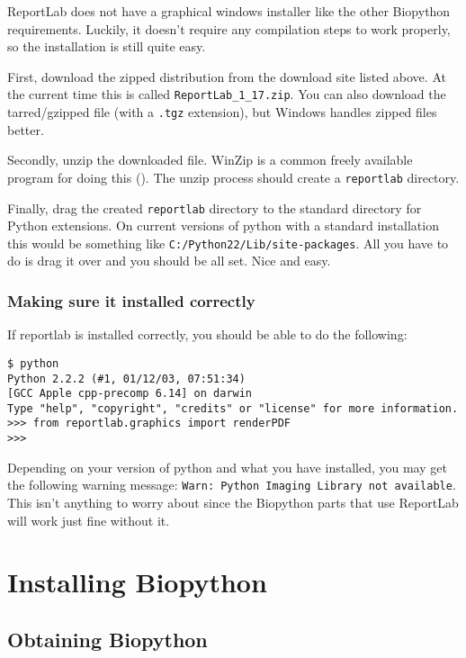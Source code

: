 \documentclass{article}
\begin{document}
ReportLab does not have a graphical windows installer like the other
Biopython requirements. Luckily, it doesn't require any compilation
steps to work properly, so the installation is still quite easy. 


First, download the zipped distribution from the download site listed
above. At the current time this is called \verb|ReportLab_1_17.zip|. You
can also download the tarred/gzipped file (with a \verb|.tgz|
extension), but Windows handles zipped files better.


Secondly, unzip the downloaded file. WinZip is a common freely available
program for doing this
(). The unzip process
should create a \verb|reportlab| directory.


Finally, drag the created \verb|reportlab| directory to the standard
directory for Python extensions. On current versions of python with a
standard installation this would be something like 
\verb|C:/Python22/Lib/site-packages|. All you have to do is drag it over
and you should be all set. Nice and easy.

\subsubsection{Making sure it installed correctly}

If reportlab is installed correctly, you should be able to do the
following:

\begin{verbatim}
$ python 
Python 2.2.2 (#1, 01/12/03, 07:51:34) 
[GCC Apple cpp-precomp 6.14] on darwin
Type "help", "copyright", "credits" or "license" for more information.
>>> from reportlab.graphics import renderPDF
>>> 
\end{verbatim}

Depending on your version of python and what you have installed, you may
get the following warning message: 
\verb|Warn: Python Imaging Library not available|. 
This isn't anything to worry about since the Biopython
parts that use ReportLab will work just fine without it.

\section{Installing Biopython}

\subsection{Obtaining Biopython}
\end{document}
